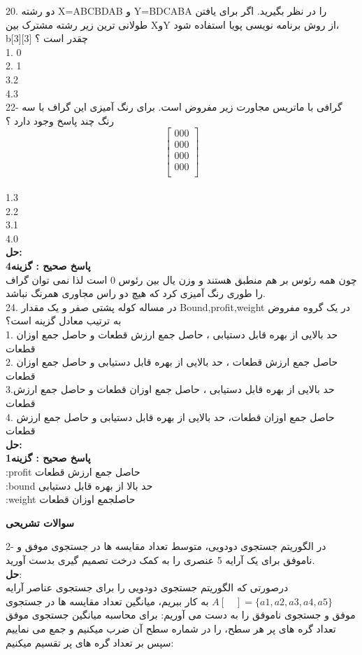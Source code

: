 \documentclass{book}
\begin{document}
20. دو رشته X=ABCBDAB و Y=BDCABA را در نظر بگیرید. اگر برای یافتن طولانی ترین زیر رشته مشترک بین XوY از روش برنامه نویسی پویا استفاده شود، b[3][3] چقدر است ؟
\\ 
1. 0 \\ 2. 1 \\ 3.2\\ 4.3 \\
22- گرافی با ماتریس مجاورت زیر مفروض است. برای رنگ آمیزی این گراف با سه رنگ چند پاسخ وجود دارد ؟ \\
\[
\begin{bmatrix}
  000    \\
  000   \\
  000    \\
  000    \\
\end{bmatrix}
\]
\\
1.3 \\ 2.2 \\ 3.1 \\ 4.0 \\
\textbf{حل:}\\
\textbf{پاسخ صحیح : گزینه4}\\
چون همه رئوس بر هم منطبق هستند و وزن یال بین رئوس 0 است لذا نمی توان گراف را طوری رنگ آمیزی کرد که هیچ دو راس مجاوری همرنگ نباشد.\\

24. در مساله کوله پشتی صفر و یک مقدار Bound,profit,weight در یک گروه مفروض به ترتیب معادل گزینه است؟\\
1. حد بالایی از بهره قابل دستیابی ، حاصل جمع ارزش قطعات و  حاصل جمع اوزان قطعات \\
2.  حاصل جمع ارزش قطعات ، حد بالایی از بهره قابل دستیابی و  حاصل جمع اوزان قطعات \\
3.حد بالایی از بهره قابل دستیابی ، حاصل جمع اوزان قطعات و  حاصل جمع ارزش قطعات \\
4. حاصل جمع اوزان قطعات، حد بالایی از بهره قابل دستیابی و حاصل جمع ارزش قطعات \\
\textbf{حل:}\\
\textbf{پاسخ صحیح : گزینه1}\\
:profit حاصل جمع ارزش قطعات \\
:bound    حد بالا از بهره قابل دستیابی
\\
:weight حاصلجمع اوزان قطعات
\\
\begin{center}
\textbf{سوالات تشریحی}\\
\end{center}
2- در الگوریتم جستجوی دودویی، متوسط تعداد مقایسه ها در جستجوی موفق و ناموفق برای یک آرایه 5 عنصری را به کمک درخت تصمیم گیری بدست آورید.\\
\textbf{حل}:\\
درصورتی که الگوریتم جستجوی دودویی را برای جستجوی عناصر آرایه $A[ \quad  ]= \lbrace a1, a2, a3, a4, a5\rbrace$ به کار ببریم، میانگین تعداد مقایسه ها در جستجوی موفق و جستجوی ناموفق را به دست می آوریم:
برای محاسبه میانگین جستجوی موفق تعداد گره های پر هر سطح، را در شماره سطح آن ضرب میکنیم و جمع می نماییم سپس بر تعداد گره های پر تقسیم میکنیم:
\end{document}
